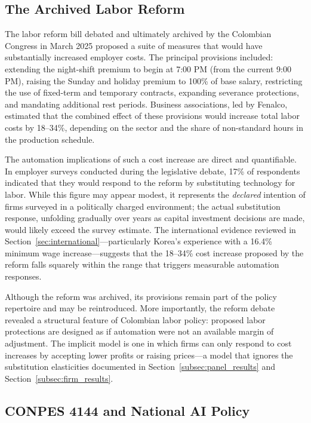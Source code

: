 \documentclass{article}
\begin{document}
\subsection{The Archived Labor Reform}
\label{subsec:labor_reform}

The labor reform bill debated and ultimately archived by the Colombian Congress in March 2025 proposed a suite of measures that would have substantially increased employer costs. The principal provisions included: extending the night-shift premium to begin at 7:00 PM (from the current 9:00 PM), raising the Sunday and holiday premium to 100\% of base salary, restricting the use of fixed-term and temporary contracts, expanding severance protections, and mandating additional rest periods. Business associations, led by Fenalco, estimated that the combined effect of these provisions would increase total labor costs by 18--34\%, depending on the sector and the share of non-standard hours in the production schedule.

The automation implications of such a cost increase are direct and quantifiable. In employer surveys conducted during the legislative debate, 17\% of respondents indicated that they would respond to the reform by substituting technology for labor. While this figure may appear modest, it represents the \textit{declared} intention of firms surveyed in a politically charged environment; the actual substitution response, unfolding gradually over years as capital investment decisions are made, would likely exceed the survey estimate. The international evidence reviewed in Section~\ref{sec:international}---particularly Korea's experience with a 16.4\% minimum wage increase---suggests that the 18--34\% cost increase proposed by the reform falls squarely within the range that triggers measurable automation responses.

Although the reform was archived, its provisions remain part of the policy repertoire and may be reintroduced. More importantly, the reform debate revealed a structural feature of Colombian labor policy: proposed labor protections are designed as if automation were not an available margin of adjustment. The implicit model is one in which firms can only respond to cost increases by accepting lower profits or raising prices---a model that ignores the substitution elasticities documented in Section~\ref{subsec:panel_results} and Section~\ref{subsec:firm_results}.

\subsection{CONPES 4144 and National AI Policy}
\label{subsec:conpes}
\end{document}
